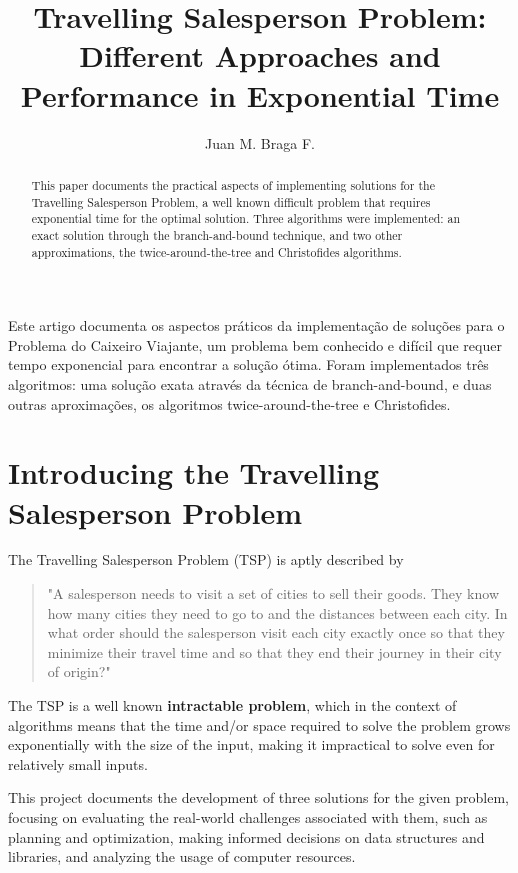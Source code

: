 \documentclass[12pt]{article}
\title{Travelling Salesperson Problem:\\ Different Approaches and Performance in Exponential Time}
\author{Juan M. Braga F.\inst{1}}
\begin{document}
 

\maketitle

\begin{abstract}
  This paper documents the practical aspects of implementing solutions
  for the Travelling Salesperson Problem, a well known difficult problem that requires
  exponential time for the optimal solution. Three algorithms were implemented:
  an exact solution through the branch-and-bound technique, and two other approximations,
  the twice-around-the-tree and Christofides algorithms.
\end{abstract}
     
\begin{resumo} 
  Este artigo documenta os aspectos práticos da implementação de soluções
  para o Problema do Caixeiro Viajante, um problema bem conhecido e difícil que requer
  tempo exponencial para encontrar a solução ótima. Foram implementados três algoritmos:
  uma solução exata através da técnica de branch-and-bound, e duas outras aproximações,
  os algoritmos twice-around-the-tree e Christofides.
\end{resumo}


\section{Introducing the Travelling Salesperson Problem}

The Travelling Salesperson Problem (TSP) is aptly described by \cite{brilliant_explanation} 

\begin{quote}
  "A salesperson needs to visit a set of cities to sell their goods. They know how 
  many cities they need to go to and the distances between each city. In what order 
  should the salesperson visit each city exactly once so that they minimize their 
  travel time and so that they end their journey in their city of origin?"
\end{quote}

The TSP is a well known \textbf{intractable problem}, which in the context of 
algorithms means that the time and/or space required to solve the problem grows 
exponentially with the size of the input, making it impractical to solve even for 
relatively small inputs.

This project documents the development of three solutions for the given problem, 
focusing on evaluating the real-world challenges associated with them, such as planning and 
optimization, making informed decisions on data structures and libraries, and 
analyzing the usage of computer resources.
\end{document}
